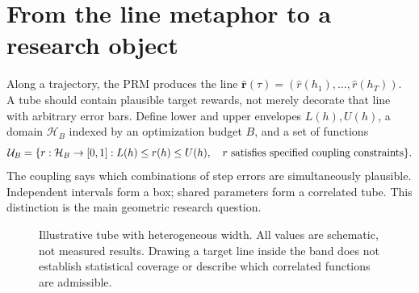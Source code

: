 \section{From the line metaphor to a research object}
\label{sec:tube}
Along a trajectory, the PRM produces the line
$\hat{\bm r}(\tau)=(\hat r(h_1),\ldots,\hat r(h_T))$. A tube should contain
plausible target rewards, not merely decorate that line with arbitrary error bars.
Define lower and upper envelopes $L(h),U(h)$, a domain $\mathcal H_B$ indexed by
an optimization budget $B$, and a set of functions
\[
 \mathcal{U}_B=\{r:\mathcal H_B\to[0,1]:L(h)\le r(h)\le U(h),\quad
 r\text{ satisfies specified coupling constraints}\}.
\]
The coupling says which combinations of step errors are simultaneously plausible.
Independent intervals form a box; shared parameters form a correlated tube.
This distinction is the main geometric research question.

\begin{figure}[ht]
\centering
{}
\caption{Illustrative tube with heterogeneous width. All values are schematic,
not measured results. Drawing a target line inside the band does not establish
statistical coverage or describe which correlated functions are admissible.}
\end{figure}

